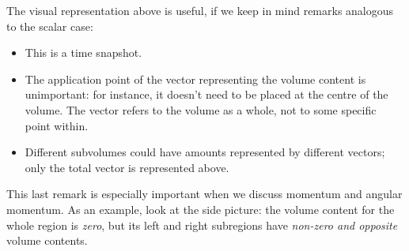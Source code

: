 \documentclass[a4paper,12pt,%
onecolumn,oneside,%
british%
]{memoir}
\renewcommand*{\|}[1][]{\nonscript\:#1\vert\nonscript\:\mathopen{}}
\begin{document}
The visual representation above is useful, if we keep in mind remarks analogous to the scalar case:
\begin{itemize}
\item This is a time snapshot.
\item\label{item:applicationpoint}The application point of the vector representing the volume content is unimportant: for instance, it doesn't need to be placed at the centre of the volume. The vector refers to the volume as a whole, not to some specific point within.
\item Different subvolumes could have amounts represented by different vectors; only the total vector is represented above.
\end{itemize}
%
%
%
This last remark is especially important when we discuss momentum and angular momentum. As an example, look at the side picture:
the volume content for the whole region is \emph{zero}, but its left and right subregions have \emph{non-zero and opposite} volume contents.
\end{document}
